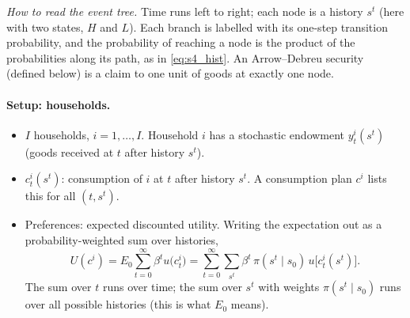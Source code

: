 \begin{center}
\end{center}
\emph{How to read the event tree.} Time runs left to right; each node is a history $s^t$ (here with two states, $H$ and $L$). Each branch is labelled with its one-step transition probability, and the probability of reaching a node is the product of the probabilities along its path, as in \eqref{eq:s4_hist}. An Arrow--Debreu security (defined below) is a claim to one unit of goods at exactly one node.

\paragraph{Setup: households.}
\begin{itemize}
  \item $I$ households, $i=1,\dots,I$. Household $i$ has a stochastic endowment $y^i_t(s^t)$ (goods received at $t$ after history $s^t$).
  \item $c^i_t(s^t)$: consumption of $i$ at $t$ after history $s^t$. A consumption plan $c^i$ lists this for all $(t,s^t)$.
  \item Preferences: expected discounted utility. Writing the expectation out as a probability-weighted sum over histories,
  \begin{equation}\label{eq:s4_U}
    U(c^i) = E_0\sum_{t=0}^{\infty}\beta^t u\big(c^i_t\big)
    = \sum_{t=0}^{\infty}\sum_{s^t}\beta^t\,\pi(s^t\mid s_0)\,u\big[c^i_t(s^t)\big].
  \end{equation}
  The sum over $t$ runs over time; the sum over $s^t$ with weights $\pi(s^t\mid s_0)$ runs over all possible histories (this is what $E_0$ means).
\end{itemize}

